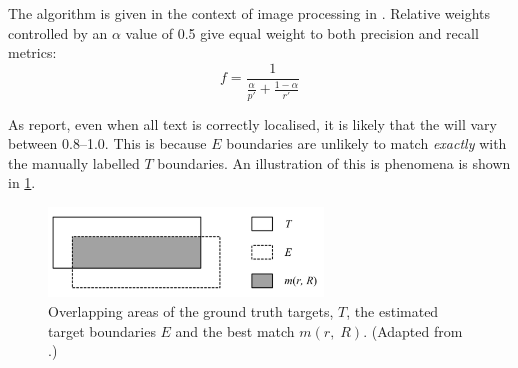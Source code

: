 The \fscore{} algorithm is given in the context of image processing in \citet{Lucas:2003iw}. Relative weights controlled by an $\alpha$ value of 0.5 give equal weight to both precision and recall metrics:
\begin{equation*}
  f = \frac{1}{\frac{\alpha}{p'} + \frac{1-\alpha}{r'}}
\end{equation*}

As \citet{Chen:2011ul} report, even when all text is correctly localised, it is likely that the \fscore{} will vary between 0.8--1.0. This is because $E$ boundaries are unlikely to match \textit{exactly} with the manually labelled $T$ boundaries. An illustration of this is phenomena is shown in \cref{fig:background:metrics:ye2005_overlapping}.

\begin{figure}[p]
  \centering
  \includegraphics[width=0.65\textwidth]{images/background/ye2005_overlapping}
  \caption[Overlapping areas of ground truth and estimated targets]{Overlapping areas of the ground truth targets, $T$, the estimated target boundaries $E$ and the best match $m(r,\;R)$. (Adapted from \citep{Ye:2005wu}.)}
  \label{fig:background:metrics:ye2005_overlapping}
\end{figure}

